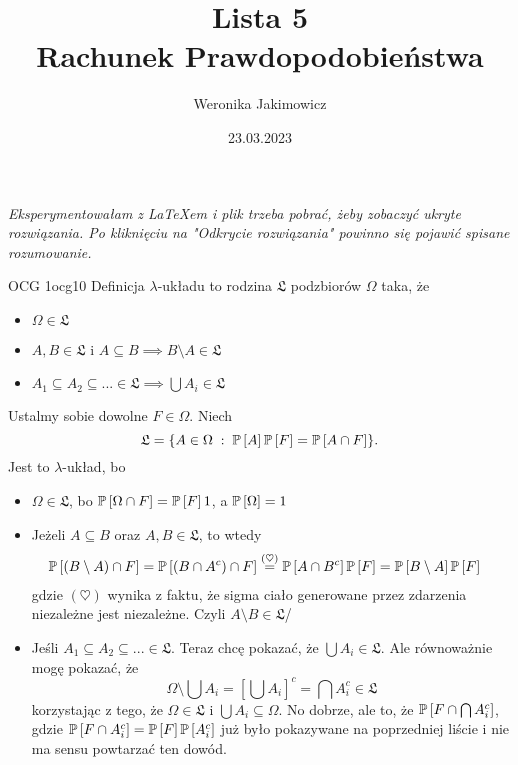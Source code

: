 \documentclass{article}
\title{Lista 5\smallskip\\{\normalsize Rachunek Prawdopodobieństwa}}
\author{Weronika Jakimowicz}
\date{23.03.2023}
\begin{document}
\maketitle
\thispagestyle{empty}

\begin{center}
\slshape Eksperymentowałam z LaTeXem i plik trzeba pobrać, żeby zobaczyć ukryte rozwiązania. Po kliknięciu na "Odkrycie rozwiązania" powinno się pojawić spisane rozumowanie.
\end{center}


\begin{ocg}{OCG 1}{ocg1}{0}
Definicja $\lambda$-układu to rodzina $\mathfrak{L}$ podzbiorów $\Omega$ taka, że
\begin{itemize}
  \item $\Omega\in\mathfrak{L}$
  \item $A,B\in\mathfrak{L}$ i $A\subseteq B\implies B\setminus A\in\mathfrak{L}$
  \item $A_1\subseteq A_2\subseteq...\in \mathfrak{L}\implies\bigcup A_i\in\mathfrak{L}$
\end{itemize}


Ustalmy sobie dowolne $F\in\Omega$. Niech 
$$\mathfrak{L}=\{A\in\Omega\;:\;\prob{A}\prob{F}=\prob{A\cap F}\}.$$
Jest to $\lambda$-układ, bo
\begin{itemize}
    \item $\Omega\in\mathfrak{L}$, bo $\prob{\Omega\cap F}=\prob{F}1$, a $\prob{\Omega}=1$
  \item Jeżeli $A\subseteq B$ oraz $A,B\in\mathfrak{L}$, to wtedy
  \begin{align*}
     \prob{(B\setminus A)\cap F}&=\prob{(B\cap A^c)\cap F}\overset{(\heartsuit)}{=}\prob{A\cap B^c}\prob{F}=\prob{B\setminus A}\prob{F}
  \end{align*}
  gdzie $(\heartsuit)$ wynika z faktu, że sigma ciało generowane przez zdarzenia niezależne jest niezależne. Czyli $A\setminus B\in\mathfrak{L}$/
   \item Jeśli $A_1\subseteq A_2\subseteq...\in\mathfrak{L}$. Teraz chcę pokazać, że $\bigcup A_i\in\mathfrak{L}$. Ale równoważnie mogę pokazać, że 
   $$\Omega\setminus\bigcup A_i=\left[\bigcup A_i\right]^c=\bigcap A_i^c\in\mathfrak{L}$$
   korzystając z tego, że $\Omega\in\mathfrak{L}$ i $\bigcup A_i\subseteq \Omega$. No dobrze, ale to, że $\prob{F\cap\bigcap A_i^c}$, gdzie $\prob{F\cap A_i^c}=\prob{F}\prob{A_i^c}$ już było pokazywane na poprzedniej liście i nie ma sensu powtarzać ten dowód.
\end{itemize}


\end{ocg}
\end{document}
